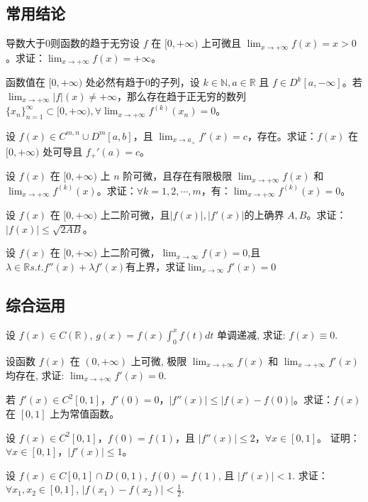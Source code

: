 \documentclass[lang=cn,10pt,thmcnt=section]{elegantbook}
\begin{document}
\subsection{常用结论}
\begin{theorem}
	导数大于0则函数的趋于无穷设 $f$ 在 $[0,+\infty)$ 上可微且 $\lim_{x \to +\infty} f(x) = x > 0$。求证：$\lim_{x \to +\infty} f(x) = +\infty$。
\end{theorem}
\begin{theorem}
	函数值在 $[0,+\infty)$ 处必然有趋于0的子列，设 $k \in \mathbb{N}, a \in \mathbb{R}$ 且 $f \in D^k[a,-\infty]$。若 $\lim_{x \to +\infty} |f|(x) \neq +\infty$，那么存在趋于正无穷的数列 $\{x_n\}_{n=1}^\infty \subset [0,+\infty), \forall \lim_{x \to +\infty} f^{(k)}(x_n) = 0$。
\end{theorem}
\begin{theorem}[导数极限定理]
	设 $f(x) \in C^{m,n} \cup D^m[a,b]$，且 $\lim_{x \to a_+} f'(x) = c$，存在。求证：$f(x)$ 在 $[0,+\infty)$ 处可导且 $f_+'(a) = c$。
\end{theorem}
\begin{theorem}[低阶导数控制高阶导数]
	设 $f(x)$ 在 $[0,+\infty)$ 上 $n$ 阶可微，且存在有限极限 $\lim_{x \to +\infty} f(x)$ 和 $\lim_{x \to +\infty} f^{(k)}(x)$。求证：$\forall k = 1,2,\cdots,m$，有：$\lim_{x \to +\infty} f^{(k)}(x) = 0$。
\end{theorem}
\begin{theorem}[低阶导数控制高阶导数]
	设 $f(x)$ 在 $[0,+\infty)$ 上二阶可微，且$
	|f(x)|,|f'(x)|$的上确界 $A,B$。求证：$|f(x)| \leq \sqrt{2AB}$。
\end{theorem}
\begin{theorem}[低阶导数控制高阶导数]
	设 $f(x)$ 在 $[0,+\infty)$ 上二阶可微，$\lim_{x \to \infty} f(x)=0 $,且$\lambda\in\mathbb{R} s.t.f''(x)+\lambda f'(x)$有上界，求证$\lim_{x \to \infty} f'(x)=0 $
\end{theorem}
\subsection{综合运用}
\begin{example}
	设 \( f(x) \in C(\mathbb{R}) \), \( g(x) = f(x)\int_{0}^{x} f(t) dt \) 单调递减, 求证: \( f(x) \equiv 0 \).
\end{example}
\begin{example}
	设函数 \( f(x) \) 在 \((0, +\infty)\) 上可微, 极限 \(\lim_{x \to +\infty} f(x)\) 和 \(\lim_{x \to +\infty} f'(x)\) 均存在, 求证: \(\lim_{x \to +\infty} f'(x) = 0\).
\end{example}
\begin{example}
	若 \( f'(x) \in C^2[0,1] \)，\( f'(0) = 0 \)，\( |f''(x)| \leq |f(x) - f(0)| \)。求证：\( f(x) \) 在 \([0,1]\) 上为常值函数。
\end{example}
\begin{example}
	设 \( f(x) \in C^2[0,1] \)，\( f(0) = f(1) \)，且 \( |f''(x)| \leq 2 \)，\(\forall x \in [0,1]\)。  
证明：\(\forall x \in [0,1]，|f'(x)| \leq 1\)。
\end{example}
\begin{example}
	设 \( f(x) \in C[0,1] \cap D(0,1) \), \( f(0) = f(1) \), 且 \( |f'(x)| < 1 \).  
求证：\( \forall x_1, x_2 \in [0,1] \), \( |f(x_1) - f(x_2)| < \frac{1}{2} \).
\end{example}
\end{document}

